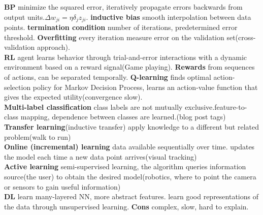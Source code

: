 \documentclass[8pt]{extarticle} %
\begin{document}
\begin{multicols}{3}
\textbf{BP} minimize the squared error, iteratively propagate errors backwards from output units.$\Delta w_{ji}=\eta \delta_jz_{ji}$. \textbf{inductive bias}  smooth interpolation between data points. \textbf{termination condition} number of iterations, predetermined error threshold. \textbf{Overfitting} every iteration measure error on the validation set(cross-validation approach).\\

\textbf{RL} agent learns behavior through trial-and-error interactions with a dynamic environment based on a reward signal(Game playing). \textbf{Rewards} from sequences of actions, can be separated temporally. \textbf{Q-learning} finds optimal action-selection policy for Markov Decision Process, learns an action-value function that gives the expected utility(convergence slow).\\

\textbf{Multi-label classification} class labels are not mutually exclusive.feature-to-class mapping, dependence between classes are learned.(blog post tags)\\

\textbf{Transfer learning}(inductive transfer) apply knowledge to a different but related problem(walk to run)\\

\textbf{Online (incremental) learning} data available sequentially over time. updates the model each time a new data point arrives(visual tracking)\\

\textbf{Active learning} semi-supervised learning, the algorithm queries information source(the user) to obtain the desired model(robotics, where to point the camera or sensors to gain useful information)\\

\textbf{DL} learn many-layered NN, more abstract features. learn good representations of the data through unsupervised learning. \textbf{Cons} complex, slow, hard to explain.

\end{multicols}
\end{document}
